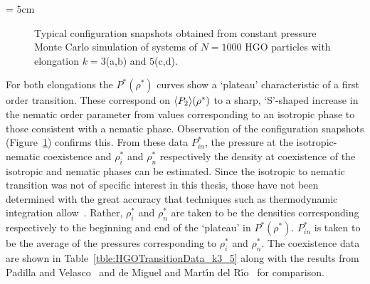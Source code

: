 \picW = 5cm
\begin{figure}
	\centering
	\hspace*{1cm}
	
	\hspace*{1cm}
	\caption{Typical configuration snapshots obtained from constant pressure Monte Carlo
	simulation of systems of $N=1000$ HGO particles with elongation $k=3$(a,b) and $5$(c,d).}
	\label{fig:HGOSnaps_k3_5}
\end{figure}


For both elongations the $P^{*}(\rho^{*})$ curves show a `plateau' characteristic of a first order
transition. These correspond on $\langle P_2 \rangle(\rho^{*})$ to a sharp, `S'-shaped increase in the nematic
order parameter from values corresponding to an isotropic phase to those consistent with a
nematic phase. Observation of the configuration snapshots (\eg Figure~\ref{fig:HGOSnaps_k3_5}) 
confirms this. From these data $P^{*}_{in}$, the pressure at the isotropic-nematic coexistence and
$\rho^{*}_{i}$ and $\rho^{*}_{n}$ respectively the density at coexistence of the isotropic and
nematic phases can be estimated. Since the isotropic to nematic transition was not of specific
interest in this thesis, those have not been determined with the great accuracy that
techniques such as thermodynamic integration allow~\cite{CampMason96,CampAllen97}. Rather, 
$\rho^{*}_{i}$ and $\rho^{*}_{n}$ are taken to be the densities corresponding respectively to the
beginning and end of the `plateau' in $P^{*}(\rho^{*})$. $P^{*}_{in}$ is taken to be the
average of the pressures corresponding to $\rho^{*}_{i}$ and $\rho^{*}_{n}$.
The coexistence data are shown in Table~\ref{tble:HGOTransitionData_k3_5} 
along with the results from Padilla and Velasco~\cite{PadillaVelasco97} and de Miguel 
and Mart\'{\i}n del R\'{\i}o~\cite{DeMiguelDelRio01} for comparison.


